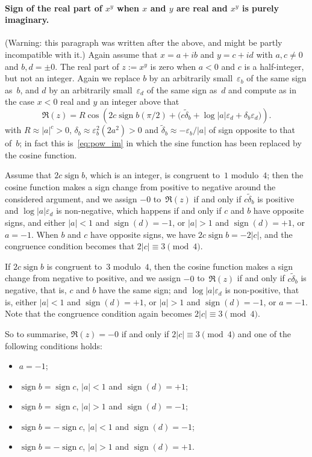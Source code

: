 \documentclass [11pt]{article}
\renewcommand {\epsilon}{\varepsilon}
\newcommand {\sign}{\operatorname{sign}}
\begin{document}
\paragraph{Sign of the real part of $x^y$ when
$x$ and $y$ are real and $x^y$ is purely imaginary.}
(Warning: this paragraph was written after the above, and might be
partly incompatible with it.)
Again assume that $x = a + i b$ and $y = c + i d$ with $a, c \neq 0$
and $b, d = \pm 0$. The real part of $z := x^y$ is zero when
$a < 0$ and $c$ is a half-integer, but not an integer.
Again we replace $b$ by an arbitrarily small~$\epsilon_b$ of the same
sign as~$b$, and $d$ by an arbitrarily small~$\epsilon_d$ of the same
sign as~$d$ and compute as in the case $x<0$ real and $y$ an integer above
that
\[
\Re (z)
= R
\cos \left( 2 c \sign b (\pi / 2)
+  \big( c \tilde \delta_b
+ \log |a| \epsilon_d + \delta_b \epsilon_d \big) \right).
\]
with $R \approx |a|^c > 0$,
$\delta_b \approx \epsilon_b^2 (2 a^2) > 0$ and
$\tilde\delta_b \approx -\epsilon_b / |a|$ of sign opposite to
that of~$b$;
in fact this is~\eqref {eq:pow_im} in which the sine function has
been replaced by the cosine function.

Assume that $2c \sign b$, which is an integer, is congruent to~$1$
modulo~$4$; then the cosine function makes a sign change from positive
to negative around the considered argument, and we assign $-0$ to~$\Re (z)$
if and only if $c \tilde \delta_b$ is positive and $\log |a| \epsilon_d$
is non-negative,
which happens if and only if $c$ and $b$ have opposite signs,
and either $|a| < 1$ and $\sign (d) = -1$,
    or     $|a| > 1$ and $\sign (d) = +1$,
    or      $a = -1$.
When $b$ and $c$ have opposite signs, we have $2 c \sign b = - 2 |c|$,
and the congruence condition becomes that $2 |c| \equiv 3 \pmod 4$.

If $2c \sign b$ is congruent to~$3$ modulo~$4$, then the cosine function
makes a sign change from negative to positive, and we assign $-0$
to~$\Re (z)$ if and only if $c \tilde \delta_b$ is negative, that is,
$c$ and $b$ have the same sign; and $\log |a| \epsilon_d$ is non-positive,
that is,
either $|a| < 1$ and $\sign (d) = +1$,
or     $|a| > 1$ and $\sign (d) = -1$,
or      $a = -1$.
Note that the congruence condition again becomes $2 |c| \equiv 3 \pmod 4$.

So to summarise, $\Re (z) = -0$ if and only if
$2 |c| \equiv 3 \pmod 4$ and one of the following conditions holds:
\begin {itemize}
\item
$a = -1$;
\item
$\sign b = \sign c$, $|a| < 1$ and $\sign (d) = +1$;
\item
$\sign b = \sign c$, $|a| > 1$ and $\sign (d) = -1$;
\item
$\sign b = -\sign c$, $|a| < 1$ and $\sign (d) = -1$;
\item
$\sign b = -\sign c$, $|a| > 1$ and $\sign (d) = +1$.
\end {itemize}
\end{document}
